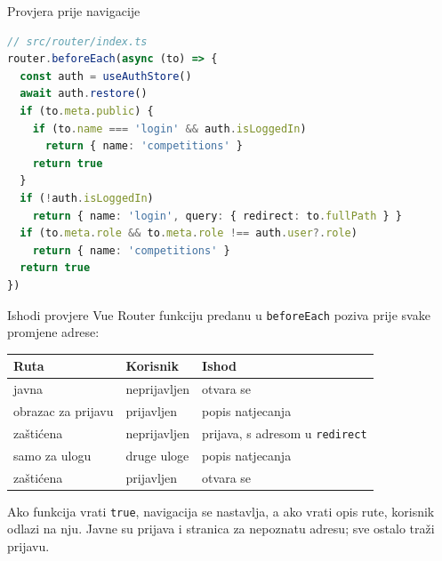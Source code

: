 \begin{frame}[fragile]{Provjera prije navigacije}
\begin{lstlisting}[language=typescript]
// src/router/index.ts
router.beforeEach(async (to) => {
  const auth = useAuthStore()
  await auth.restore()
  if (to.meta.public) {
    if (to.name === 'login' && auth.isLoggedIn)
      return { name: 'competitions' }
    return true
  }
  if (!auth.isLoggedIn)
    return { name: 'login', query: { redirect: to.fullPath } }
  if (to.meta.role && to.meta.role !== auth.user?.role)
    return { name: 'competitions' }
  return true
})
\end{lstlisting}
\end{frame}

\begin{frame}{Ishodi provjere}
Vue Router funkciju predanu u \texttt{beforeEach} poziva prije svake promjene adrese:

\vspace{0.3em}
\begin{center}
{\small
\setlength{\tabcolsep}{6pt}
\renewcommand{\arraystretch}{1.3}
\begin{tabular}{@{}L{3.0cm}L{2.8cm}L{5.4cm}@{}}
  \toprule
  \textbf{Ruta} & \textbf{Korisnik} & \textbf{Ishod} \\
  \midrule
  javna & neprijavljen & otvara se \\
  obrazac za prijavu & prijavljen & popis natjecanja \\
  zaštićena & neprijavljen & prijava, s adresom u \texttt{redirect} \\
  samo za ulogu & druge uloge & popis natjecanja \\
  zaštićena & prijavljen & otvara se \\
  \bottomrule
\end{tabular}
}
\end{center}

\vspace{0.4em}
Ako funkcija vrati \texttt{true}, navigacija se nastavlja, a ako vrati opis rute, korisnik odlazi na nju. Javne su prijava i stranica za nepoznatu adresu; sve ostalo traži prijavu.
\end{frame}

